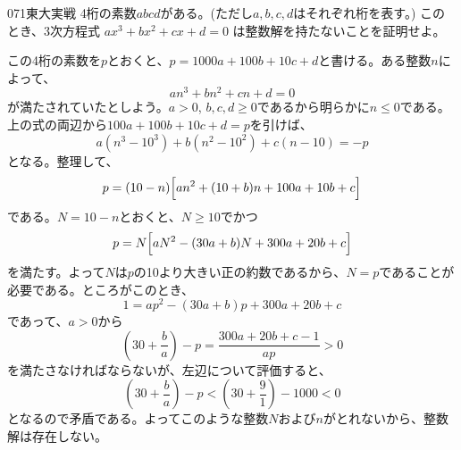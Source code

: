 \begin{thm}{071}{}{東大実戦}
 4桁の素数$abcd$がある。(ただし$a, b, c, d$はそれぞれ桁を表す。) このとき、3次方程式 $ax^3+bx^2+cx+d=0$ は整数解を持たないことを証明せよ。
\end{thm}

この4桁の素数を$p$とおくと、$p=1000a+100b+10c+d$と書ける。ある整数$n$によって、
\[ an^3+bn^2+cn+d=0 \]
が満たされていたとしよう。$a>0$, $b, c, d\ge 0$であるから明らかに$n\le 0$である。上の式の両辺から$100a+100b+10c+d=p$を引けば、
\[ a(n^3-10^3)+b(n^2-10^2)+c(n-10)=-p \]
となる。整理して、
\[ p=(10-n)\Bigl[an^2+(10+b)n+100a+10b+c\Bigr] \]
である。$N=10-n$とおくと、$N\ge 10$でかつ
\[ p=N\Bigl[aN^2-(30a+b)N+300a+20b+c\Bigr] \]
を満たす。よって$N$は$p$の10より大きい正の約数であるから、$N=p$であることが必要である。ところがこのとき、
\[ 1=ap^2-(30a+b)p+300a+20b+c \]
であって、$a>0$から
\[ \left(30+\frac{b}{a}\right)-p = \frac{300a+20b+c-1}{ap}>0 \]
を満たさなければならないが、左辺について評価すると、
\[ \left(30+\frac{b}{a}\right)-p < \left(30+\frac{9}{1}\right)-1000 < 0 \]
となるので矛盾である。よってこのような整数$N$および$n$がとれないから、整数解は存在しない。